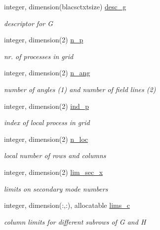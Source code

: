 \begin{DoxyCompactItemize}
integer, dimension(blacsctxtsize) \hyperlink{structvac__vars_1_1vac__type_a8c1903cbdc406915f473535daa1cafb7}{desc\+\_\+g}
\begin{DoxyCompactList}\small\item\em descriptor for G \end{DoxyCompactList}\item 
integer, dimension(2) \hyperlink{structvac__vars_1_1vac__type_aaf6def83c79ec72152b8aa27081fde11}{n\+\_\+p}
\begin{DoxyCompactList}\small\item\em nr. of processes in grid \end{DoxyCompactList}\item 
integer, dimension(2) \hyperlink{structvac__vars_1_1vac__type_ac337095579ae842776d35a4b975254e8}{n\+\_\+ang}
\begin{DoxyCompactList}\small\item\em number of angles (1) and number of field lines (2) \end{DoxyCompactList}\item 
integer, dimension(2) \hyperlink{structvac__vars_1_1vac__type_ae875caaff6d6ddf9bf6abba721f081ec}{ind\+\_\+p}
\begin{DoxyCompactList}\small\item\em index of local process in grid \end{DoxyCompactList}\item 
integer, dimension(2) \hyperlink{structvac__vars_1_1vac__type_ad773e9aa724066256c3955a1a98a1d63}{n\+\_\+loc}
\begin{DoxyCompactList}\small\item\em local number of rows and columns \end{DoxyCompactList}\item 
integer, dimension(2) \hyperlink{structvac__vars_1_1vac__type_a838017f000d61fd3c40edba18b57e558}{lim\+\_\+sec\+\_\+x}
\begin{DoxyCompactList}\small\item\em limits on secondary mode numbers \end{DoxyCompactList}\item 
integer, dimension(\+:,\+:), allocatable \hyperlink{structvac__vars_1_1vac__type_ad4aa76e0d91f32808465d15ac04528ec}{lims\+\_\+c}
\begin{DoxyCompactList}\small\item\em column limits for different subrows of G and H \end{DoxyCompactList}\item 

\end{DoxyCompactItemize}
